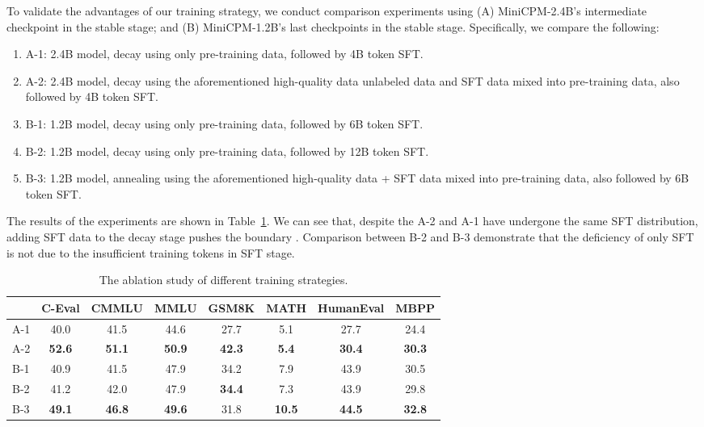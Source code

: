 \documentclass[dvipsnames]{article}
\begin{document}
To validate the advantages of our training strategy, we conduct comparison experiments using (A) MiniCPM-2.4B's intermediate checkpoint in the stable stage; and (B) MiniCPM-1.2B's last checkpoints in the stable stage. Specifically, we compare the following:

\begin{enumerate}
    \item A-1: 2.4B model, decay using only pre-training data, followed by 4B token SFT.
    \item A-2: 2.4B model, decay using the aforementioned high-quality data unlabeled data and SFT data mixed into pre-training data, also followed by 4B token SFT.
    \item B-1: 1.2B model, decay using only pre-training data, followed by 6B token SFT.
    \item B-2: 1.2B model, decay using only pre-training data, followed by 12B token SFT.
    \item B-3: 1.2B model, annealing using the aforementioned high-quality data + SFT data mixed into pre-training data, also followed by 6B token SFT. 
\end{enumerate}

The results of the experiments are shown in Table~\ref{tab:dataexperiments}. We can see that, despite the  
A-2 and A-1 have undergone the same SFT distribution, adding SFT data to the decay stage pushes the boundary 
. Comparison between B-2 and B-3 demonstrate that the deficiency of only SFT is not due to the insufficient training tokens in SFT stage. 

\begin{table}[h]
\centering
\begin{tabular}{lccccccc}
\toprule
            & \textbf{C-Eval} & \textbf{CMMLU} & \textbf{MMLU} & \textbf{GSM8K} & \textbf{MATH} & \textbf{HumanEval} & \textbf{MBPP} \\ \midrule
A-1 & 40.0  & 41.5  & 44.6 & 27.7  & 5.1  & 27.7      & 24.4 \\
A-2 & \textbf{52.6}  & \textbf{51.1} & \textbf{50.9} & \textbf{42.3 } & \textbf{5.4}  & \textbf{30.4 }     & \textbf{30.3} \\
\midrule

B-1 &   40.9  & 41.5 & 47.9 &  34.2 & 7.9   &  43.9 & 30.5 \\
B-2 &  41.2 &  42.0 &    47.9  & \textbf{34.4} & 7.3 &  43.9 & 29.8  \\ 
B-3 & \textbf{49.1}  & \textbf{46.8}  & \textbf{49.6} & 31.8  & \textbf{10.5}  & \textbf{44.5}  & \textbf{32.8}\\
\bottomrule
\end{tabular}
\caption{The ablation study of different training strategies.
}
\label{tab:dataexperiments}
\end{table}
\end{document}
